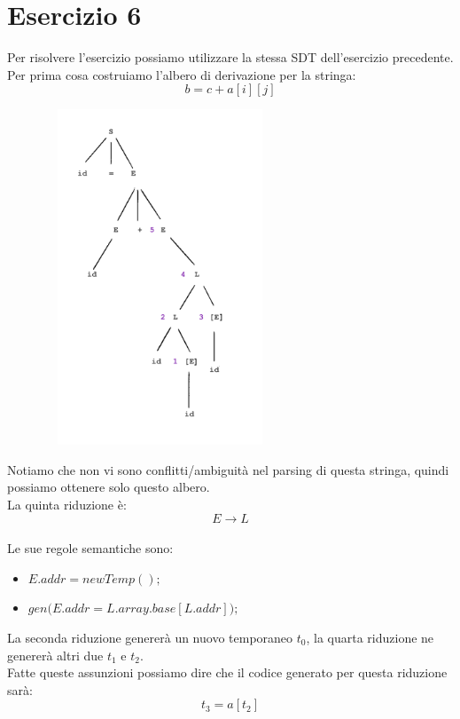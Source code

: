 \documentclass[11pt]{article}
\begin{document}
\section{Esercizio 6}
Per risolvere l'esercizio possiamo utilizzare la stessa SDT dell'esercizio precedente.
Per prima cosa costruiamo l'albero di derivazione per la stringa:
$$b =  c + a[i][j]$$
\begin{center}
  \begin{minipage}[t]{\linewidth}
    \begin{multicols}{2}
      \begin{figure}[H]
        \includegraphics[height=10cm, width=7cm]{./img/06DerivationTree.png}
      \end{figure}
      Notiamo che non vi sono conflitti/ambiguità nel parsing di questa stringa, 
      quindi possiamo ottenere solo questo albero.
      \\La quinta riduzione è: $$E \rightarrow L$$
      \\Le sue regole semantiche sono: 
      \begin{itemize}
        \item $E.addr = newTemp();$
        \item $gen\big(E.addr = L.array.base[L.addr]\big);$
      \end{itemize}
      La seconda riduzione genererà un nuovo temporaneo $t_0$, 
      la quarta riduzione ne genererà altri due $t_1$ e $t_2$.
      \\Fatte queste assunzioni possiamo dire che il codice generato
      per questa riduzione sarà: $$t_3 = a[t_2]$$
      $$$$
    \end{multicols}
  \end{minipage}
\end{center}
\end{document}
